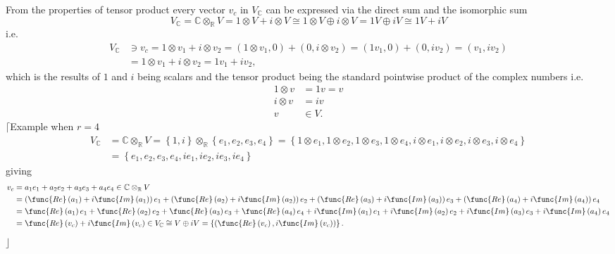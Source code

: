 \documentclass[aps,preprint]{revtex4}
\begin{document}
From the properties of tensor product every vector $v_{c}$ in $V_{\mathbb{C}%
} $ can be expressed via the direct sum and the isomorphic sum%
\begin{equation}
V_{\mathbb{C}}=\mathbb{C}\otimes_{\mathbb{R}}V=1\otimes V+i\otimes
V\cong1\otimes V\oplus i\otimes V=1V\oplus iV\cong1V+iV
\end{equation}
i.e. 
\begin{align*}
V_{\mathbb{C}} & \ni v_{c}=1\otimes v_{1}+i\otimes v_{2}=\left( 1\otimes
v_{1},0\right) +\left( 0,i\otimes v_{2}\right) =\left( 1v_{1},0\right)
+\left( 0,iv_{2}\right) =\left( v_{1},iv_{2}\right) \\
& =1\otimes v_{1}+i\otimes v_{2}=1v_{1}+iv_{2},
\end{align*}
which is the results of $1$ and $i$ being scalars and the tensor product
being the standard pointwise product of the complex numbers i.e. 
\begin{align}
1\otimes v & =1v=v \\
i\otimes v & =iv \\
v & \in V.
\end{align}
$\lceil$Example when $r=4$%
\begin{align}
V_{\mathbb{C}} & =\mathbb{C}\otimes_{\mathbb{R}}V=\left\{ 1,i\right\}
\otimes_{\mathbb{R}}\left\{ e_{1},e_{2},e_{3},e_{4}\right\} =\left\{
1\otimes e_{1},1\otimes e_{2},1\otimes e_{3},1\otimes e_{4},i\otimes
e_{1},i\otimes e_{2},i\otimes e_{3},i\otimes e_{4}\right\} \\
& =\left\{ e_{1},e_{2},e_{3},e_{4},ie_{1},ie_{2},ie_{3},ie_{4}\right\}
\end{align}
giving%
\begin{align}
v_{c} & =a_{1}e_{1}+a_{2}e_{2}+a_{3}e_{3}+a_{4}e_{4}\in\mathbb{C}\otimes_{%
\mathbb{R}}V \\
& =\left( \func{Re}\left( a_{1}\right) +i\func{Im}\left( a_{1}\right)
\right) e_{1}+\left( \func{Re}\left( a_{2}\right) +i\func{Im}\left(
a_{2}\right) \right) e_{2}+\left( \func{Re}\left( a_{3}\right) +i\func{Im}%
\left( a_{3}\right) \right) e_{3}+\left( \func{Re}\left( a_{4}\right) +i%
\func{Im}\left( a_{4}\right) \right) e_{4} \\
& =\func{Re}\left( a_{1}\right) e_{1}+\func{Re}\left( a_{2}\right) e_{2}+%
\func{Re}\left( a_{3}\right) e_{3}+\func{Re}\left( a_{4}\right) e_{4}+i\func{%
Im}\left( a_{1}\right) e_{1}+i\func{Im}\left( a_{2}\right) e_{2}+i\func{Im}%
\left( a_{3}\right) e_{3}+i\func{Im}\left( a_{4}\right) e_{4} \\
& =\func{Re}\left( v_{c}\right) +i\func{Im}\left( v_{c}\right) \in V_{%
\mathbb{C}}\cong V\oplus iV=\left\{ \left( \func{Re}\left( v_{c}\right) ,i%
\func{Im}\left( v_{c}\right) \right) \right\} .
\end{align}
$\rfloor$
\end{document}
